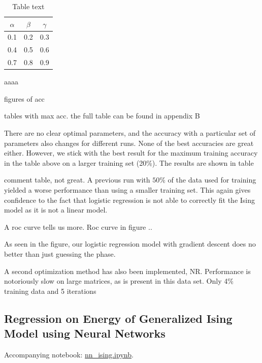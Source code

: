 \begin{table}[H]
\caption{Table text}
\centering
{}
\begin{tabular}{ccc}
\hline
\hline 
$\alpha$ & $\beta$ & $\gamma$
\\
\hline 
\hline 
0.1 & 0.2 & 0.3
\\
0.4 & 0.5 & 0.6
\\
0.7 & 0.8 & 0.9
\\
\hline
\end{tabular}
\label{tab:tab1}
\end{table}

aaaa


figures of acc

tables with max acc. the full table can be found in appendix B


There are no clear optimal parameters, and the accuracy with a particular set of parameters also changes for different runs. None of the best accuracies are great either. However, we stick with the best result for the maximum training accuracy in the table above on a larger training set (20\%). The results are shown in table


comment table, not great. A previous run with $50\%$ of the data used for training yielded a worse performance than using a smaller training set. This again gives confidence to the fact that logistic regression is not able to correctly fit the Ising model as it is not a linear model. 

A roc curve tells us more. Roc curve in figure ..


As seen in the figure, our logistic regression model with gradient descent does no better than just guessing the phase.

A second optimization method has also been implemented, NR.
Performance is notoriously slow on large matrices, as is present in this data set. Only 4\% training data and 5 iterations 





\subsection{Regression on Energy of Generalized Ising Model using Neural Networks}\label{sec:results NN reg}
Accompanying notebook: \href{https://github.com/nicolossus/FYS-STK4155-Project2/blob/master/notebooks/nn_ising.ipynb}{nn\_ising.ipynb}.


